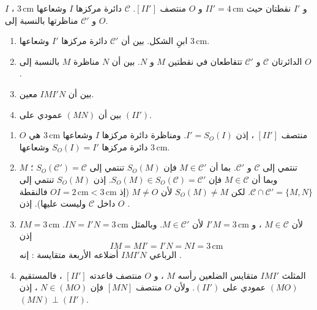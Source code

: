 \documentclass[12pt,a4paper]{article}
\newcommand{\cm}{\,\mathrm{cm}}
\begin{document}
\begin{corr}[title={دائرتان متناظرتان}, stars=3, source={Axiomaths}]
$I$ و $I'$ نقطتان حيث $II'=4\cm$ و $O$ منتصف $[II']$. $\mathcal{C}$ دائرة مركزها $I$ وشعاعها $3\cm$ ، و $\mathcal{C}'$ مناظرتها بالنسبة إلى $O$.
\begin{enumerate}
  \item ابنِ الشكل. بين أن $\mathcal{C}'$ دائرة مركزها $I'$ وشعاعها $3\cm$.
  \item الدائرتان $\mathcal{C}$ و $\mathcal{C}'$ تتقاطعان في نقطتين $M$ و $N$. بين أن $N$ مناظرة $M$ بالنسبة إلى $O$.
  \item بين أن $IMI'N$ معين.
  \item بين أن $(MN)$ عمودي على $(II')$.
\end{enumerate}
\axsol
\begin{enumerate}[itemsep=14pt]
  \item $O$ منتصف $[II']$ ، إذن $I'=S_O(I)$. ومناظرة دائرة مركزها $I$ وشعاعها $3\cm$ هي دائرة مركزها $S_O(I)=I'$ وشعاعها $3\cm$.
  \begin{center}
  \end{center}
  \item $M$ تنتمي إلى $\mathcal{C}$ و $\mathcal{C}'$. بما أن $M\in\mathcal{C}'$ فإن $S_O(M)$ تنتمي إلى $S_O(\mathcal{C}')=\mathcal{C}$ ؛ وبما أن $M\in\mathcal{C}$ فإن $S_O(M)\in S_O(\mathcal{C})=\mathcal{C}'$.
  إذن $S_O(M)$ تنتمي إلى $\mathcal{C}\cap\mathcal{C}'=\{M,N\}$.
  لكن $S_O(M)\neq M$ لأن $M\neq O$ (إذ $OI=2\cm<3\cm$ فالنقطة $O$ داخل $\mathcal{C}$ وليست عليها). إذن .
  \item $IM=3\cm$ لأن $M\in\mathcal{C}$ ، و $I'M=3\cm$ لأن $M\in\mathcal{C}'$. وبالمثل $IN=I'N=3\cm$. إذن
  \[IM=MI'=I'N=NI=3\cm\]
  الرباعي $IMI'N$ أضلاعه الأربعة متقايسة : إنه .
  \item المثلث $IMI'$ متقايس الضلعين رأسه $M$ ، و $O$ منتصف قاعدته $[II']$ ، فالمستقيم $(MO)$ عمودي على $(II')$. ولأن $O$ منتصف $[MN]$ فإن $N\in(MO)$ ، إذن $(MN)\perp(II')$.
\end{enumerate}
\end{corr}
\end{document}
